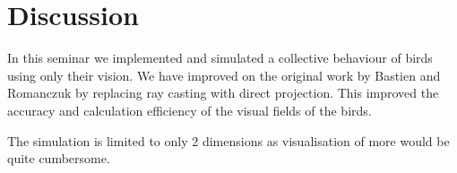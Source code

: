 \documentclass[9pt]{pnas-new}
\begin{document}








































\section*{Discussion}

In this seminar we implemented and simulated a collective behaviour of birds using only their vision.
We have improved on the original work by Bastien and Romanczuk \cite{main-paper} by replacing ray casting with direct projection.
This improved the accuracy and calculation efficiency of the visual fields of the birds.

The simulation is limited to only 2 dimensions as visualisation of more would be quite cumbersome. 

\end{document}
